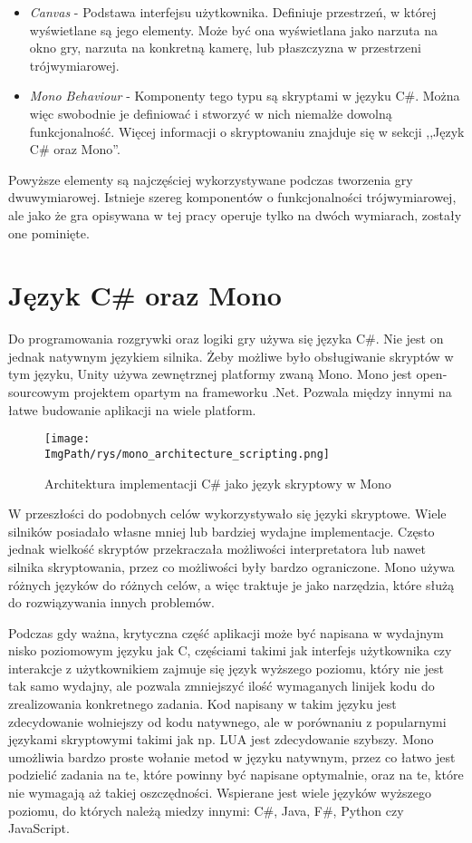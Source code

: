 \documentclass[a4paper,12pt,twoside,openany]{report}
\newcommand{\ImgPath}{.}
\begin{document}
\begin{itemize}
    \item \textit{Canvas} - Podstawa interfejsu użytkownika. Definiuje przestrzeń, w której wyświetlane są jego elementy. Może być ona wyświetlana jako narzuta na okno gry, narzuta na konkretną kamerę, lub płaszczyzna w przestrzeni trójwymiarowej.
    \item \textit{Mono Behaviour} - Komponenty tego typu są skryptami w języku C\#. Można więc swobodnie je definiować i stworzyć w nich niemalże dowolną funkcjonalność. Więcej informacji o skryptowaniu znajduje się w sekcji ,,Język C\# oraz Mono''.
\end{itemize}
Powyższe elementy są najczęściej wykorzystywane podczas tworzenia gry dwuwymiarowej. Istnieje szereg komponentów o funkcjonalności trójwymiarowej, ale jako że gra opisywana w tej pracy operuje tylko na dwóch wymiarach, zostały one pominięte.

\section{Język C\# oraz Mono}

Do programowania rozgrywki oraz logiki gry używa się języka C\#. Nie jest on jednak natywnym językiem silnika. Żeby możliwe było obsługiwanie skryptów w tym języku, Unity używa zewnętrznej platformy zwaną Mono. Mono jest open-sourcowym projektem opartym na frameworku .Net\cite{about_mono}. Pozwala między innymi na łatwe budowanie aplikacji na wiele platform.

\begin{figure}[!htbp]
	\begin{center}
\centering
\texttt{[image: \\ImgPath/rys/mono\_architecture\_scripting.png]}
\end{center}
	\caption{Architektura implementacji C\# jako język skryptowy w Mono}
	\label{mono_architecture_scripting}
\end{figure}

W przeszłości do podobnych celów wykorzystywało się języki skryptowe. Wiele silników posiadało własne mniej lub bardziej wydajne implementacje. Często jednak wielkość skryptów przekraczała możliwości interpretatora lub nawet silnika skryptowania, przez co możliwości były bardzo ograniczone. Mono używa różnych języków do różnych celów, a więc traktuje je jako narzędzia, które służą do rozwiązywania innych problemów.

Podczas gdy ważna, krytyczna część aplikacji może być napisana w wydajnym nisko poziomowym języku jak C, częściami takimi jak interfejs użytkownika czy interakcje z użytkownikiem zajmuje się język wyższego poziomu, który nie jest tak samo wydajny, ale pozwala zmniejszyć ilość wymaganych linijek kodu do zrealizowania konkretnego zadania. Kod napisany w takim języku jest zdecydowanie wolniejszy od kodu natywnego, ale w porównaniu z popularnymi językami skryptowymi takimi jak np. LUA jest zdecydowanie szybszy. Mono umożliwia bardzo proste wołanie metod w języku natywnym, przez co łatwo jest podzielić zadania na te, które powinny być napisane optymalnie, oraz na te, które nie wymagają aż takiej oszczędności. Wspierane jest wiele języków wyższego poziomu, do których należą miedzy innymi: C\#, Java, F\#, Python czy JavaScript.
\end{document}
